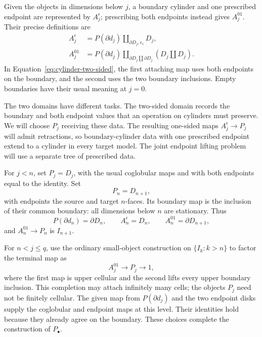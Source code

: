 \documentclass[11pt,letterpaper]{article}
\numberwithin{equation}{section}
\theoremstyle{plain}
\theoremstyle{definition}
\theoremstyle{remark}
\begin{document}
Given the objects in dimensions below \(j\), a boundary cylinder and
one prescribed endpoint are represented by \(A_j^\epsilon\); prescribing
both endpoints instead gives \(A_j^{01}\).  Their precise definitions are
\begin{align}
 A_j^\epsilon
   &=P(\partial d_j)\amalg_{\partial D_j,e_\epsilon}D_j,
       \label{eq:cylinder-one-sided}\\
 A_j^{01}
   &=P(\partial d_j)
       \amalg_{\partial D_j\amalg\partial D_j}
                    (D_j\amalg D_j).
       \label{eq:cylinder-two-sided}
\end{align}
In Equation~\eqref{eq:cylinder-two-sided}, the first attaching map uses
both endpoints on the boundary, and the second uses the two boundary
inclusions.  Empty boundaries have their usual meaning at \(j=0\).

The two domains have different tasks.  The two-sided domain records
the boundary and both endpoint values that an operation on cylinders
must preserve.  We will choose \(P_j\) receiving these data.  The
resulting one-sided maps \(A_j^\epsilon\to P_j\) will admit
retractions, so boundary-cylinder data with one prescribed endpoint
extend to a cylinder in every target model.  The joint endpoint lifting problem will use a
separate tree of prescribed data.

For \(j<n\), set \(P_j=D_j\), with the usual coglobular maps and
with both endpoints equal to the identity.  Set
\[
                  P_n=D_{n+1},
\]
with endpoints the source and target \(n\)-faces.  Its boundary map
is the inclusion of their common boundary: all dimensions below \(n\)
are stationary.  Thus
\begin{equation}\label{eq:cylinder-critical-level}
 P(\partial d_n)=\partial D_n,\qquad
 A_n^\epsilon=D_n,\qquad
 A_n^{01}=\partial D_{n+1},
\end{equation}
and \(A_n^{01}\to P_n\) is \(I_{n+1}\).

For \(n<j\le q\), use the ordinary small-object construction on
\(\{I_k:k>n\}\) to factor the terminal map as
\begin{equation}\label{eq:cylinder-upper-completion}
 A_j^{01}\longrightarrow P_j\longrightarrow 1,
\end{equation}
where the first map is upper cellular and the second lifts every
upper boundary inclusion.  This completion may attach infinitely
many cells; the objects \(P_j\) need not be finitely cellular.
The given map from \(P(\partial d_j)\)
and the two endpoint disks supply the coglobular and endpoint maps at
this level.  Their identities hold because they already agree on the
boundary.  These choices complete the construction of \(P_\bullet\).
\end{document}
